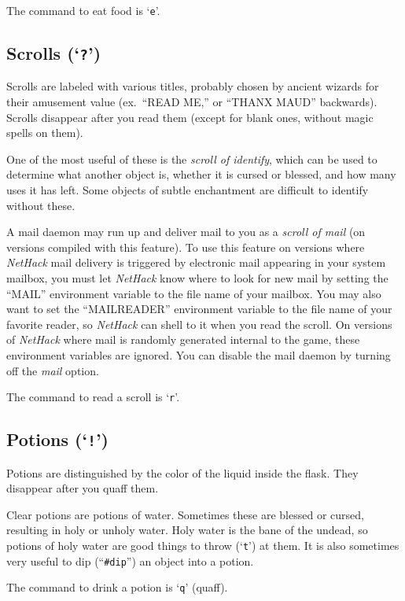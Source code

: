 The command to eat food is `{\tt e}'.

\subsection*{Scrolls (`{\tt ?}')}

Scrolls are labeled with various titles, probably chosen by ancient wizards
for their amusement value (ex.\ ``READ ME,'' or ``THANX MAUD'' backwards).
Scrolls disappear after you read them (except for blank ones, without
magic spells on them).

One of the most useful of these is the %
{\it scroll of identify}, which
can be used to determine what another object is, whether it is cursed or
blessed, and how many uses it has left.  Some objects of subtle
enchantment are difficult to identify without these.

A mail daemon may run up and deliver mail to you as a %
{\it scroll of mail} (on versions compiled with this feature).
To use this feature on versions where {\it NetHack\/}
mail delivery is triggered by electronic mail appearing in your system mailbox,
you must let {\it NetHack\/} know where to look for new mail by setting the
``MAIL'' environment variable to the file name of your mailbox.
You may also want to set the ``MAILREADER'' environment variable to the
file name of your favorite reader, so {\it NetHack\/} can shell to it when you
read the scroll.
On versions of {\it NetHack\/} where mail is randomly
generated internal to the game, these environment variables are ignored.
You can disable the mail daemon by turning off the
{\it mail\/} option.

The command to read a scroll is `{\tt r}'.

\subsection*{Potions (`{\tt !}')}

Potions are distinguished by the color of the liquid inside the flask.
They disappear after you quaff them.

Clear potions are potions of water.  Sometimes these are
blessed or cursed, resulting in holy or unholy water.  Holy water is
the bane of the undead, so potions of holy water are good things to
throw (`{\tt t}') at them.  It is also sometimes very useful to dip
(``{\tt \#dip}'') an object into a potion.

The command to drink a potion is `{\tt q}' (quaff).

